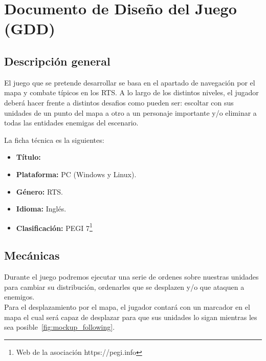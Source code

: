 \chapter{Documento de Diseño del Juego (GDD)}
\label{GDD}

\section{Descripción general}
El juego que se pretende desarrollar se basa en el apartado de navegación por el mapa y combate
típicos en los \ac{RTS}. A lo largo de los distintos niveles, el jugador deberá hacer
frente a distintos desafios como pueden ser: escoltar con sus unidades de un punto
del mapa a otro a un personaje importante y/o eliminar a todas las entidades enemigas del escenario.

La ficha técnica es la siguientes:

\begin{itemize}
	\item \textbf{Título:} 
	\item \textbf{Plataforma:} \ac{PC} (Windows y Linux).
	\item \textbf{Género:} \acf{RTS}.
	\item \textbf{Idioma:} Inglés.
	\item \textbf{Clasificación:} PEGI 7\footnote{Web de la asociación https://pegi.info}
\end{itemize}

\section{Mecánicas}
Durante el juego podremos ejecutar una serie de ordenes sobre nuestras unidades para cambiar
su distribución, ordenarles que se desplazen y/o que ataquen a enemigos.\\
Para el desplazamiento por el mapa, el jugador contará con un marcador en el mapa el cual
será capaz de desplazar para que sus unidades lo sigan mientras les sea posible~\ref{fig:mockup_following}.




